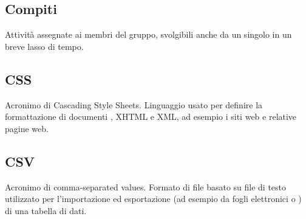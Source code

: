 \subsection*{Compiti}
Attività assegnate ai membri del gruppo, svolgibili anche da un singolo in un breve lasso di tempo.

\subsection*{CSS}
Acronimo di Cascading Style Sheets. Linguaggio usato per definire la formattazione di documenti , XHTML e XML, ad esempio i siti web e relative pagine web.

\subsection*{CSV}
Acronimo di comma-separated values. Formato di file basato su file di testo utilizzato per l'importazione ed esportazione (ad esempio da fogli elettronici o ) di una tabella di dati. 



